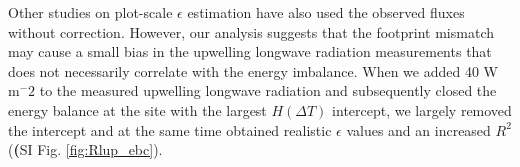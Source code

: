 \documentclass[fleqn,10pt]{wlscirep}
\begin{document}
{{Other studies on plot-scale $\epsilon$ estimation have also used the observed fluxes without correction\cite{chen2003surface, holmes_land_2009-1,juang2007separating,maes2019potential}. 
However, our analysis suggests that the footprint mismatch may cause a small bias in the upwelling longwave radiation measurements that does not necessarily correlate with the energy imbalance. When we added 40 W m$^-{2}$ to the measured upwelling longwave radiation and subsequently closed the energy balance at the site with the largest $H(\Delta T)$ intercept, we largely removed the intercept and at the same time obtained realistic $\epsilon$ values and an increased $R^2$ (\textbf(SI Fig. \ref{fig:Rlup_ebc}).

}}
\end{document}
